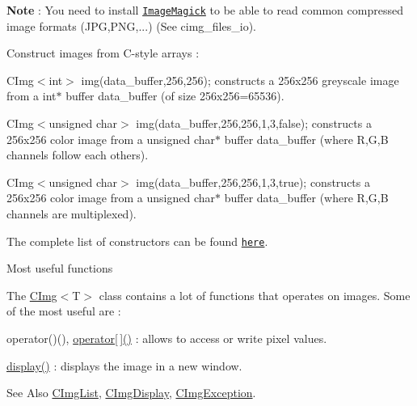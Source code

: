 \begin{DoxyItemize}
\begin{DoxyItemize}
\item {\bfseries Note} \-: You need to install \href{http://www.imagemagick.org}{\tt Image\-Magick} to be able to read common compressed image formats (J\-P\-G,P\-N\-G,...) (See cimg\-\_\-files\-\_\-io).
\end{DoxyItemize}
\item Construct images from C-\/style arrays \-:
\begin{DoxyItemize}
\item {\ttfamily C\-Img$<$int$>$ img(data\-\_\-buffer,256,256);} constructs a 256x256 greyscale image from a {\ttfamily int$\ast$} buffer {\ttfamily data\-\_\-buffer} (of size 256x256=65536).
\item {\ttfamily C\-Img$<$unsigned char$>$ img(data\-\_\-buffer,256,256,1,3,false);} constructs a 256x256 color image from a {\ttfamily unsigned} {\ttfamily char$\ast$} buffer {\ttfamily data\-\_\-buffer} (where R,G,B channels follow each others).
\item {\ttfamily C\-Img$<$unsigned char$>$ img(data\-\_\-buffer,256,256,1,3,true);} constructs a 256x256 color image from a {\ttfamily unsigned} {\ttfamily char$\ast$} buffer {\ttfamily data\-\_\-buffer} (where R,G,B channels are multiplexed).
\end{DoxyItemize}

The complete list of constructors can be found \href{#constructors}{\tt here}.
\end{DoxyItemize}

\begin{DoxyParagraph}{Most useful functions}

\end{DoxyParagraph}
The \hyperlink{structcimg__library_1_1_c_img}{C\-Img}$<${\ttfamily T$>$} class contains a lot of functions that operates on images. Some of the most useful are \-:


\begin{DoxyItemize}
\item operator()(), \hyperlink{structcimg__library_1_1_c_img_a53ee85b82244ff16acd428e5ad655540}{operator\mbox{[}$\,$\mbox{]}()} \-: allows to access or write pixel values.
\item \hyperlink{structcimg__library_1_1_c_img_aab8c37b9dc626927623f68759fe83e83}{display()} \-: displays the image in a new window.
\end{DoxyItemize}

\begin{DoxySeeAlso}{See Also}
\hyperlink{structcimg__library_1_1_c_img_list}{C\-Img\-List}, \hyperlink{structcimg__library_1_1_c_img_display}{C\-Img\-Display}, \hyperlink{structcimg__library_1_1_c_img_exception}{C\-Img\-Exception}. 
\end{DoxySeeAlso}


